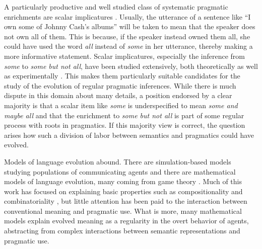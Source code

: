 \documentclass[a4paper, 11pt]{article}
\theoremstyle{Satz}
\begin{document}
A particularly productive and well studied class of systematic pragmatic enrichments are scalar
implicatures
\citep{horn:1984,Hirschberg1985:A-Theory-of-Sca,LevinsonPragmatics1983,Geurts2010:Quantity-Implic}. Usually,
the utterance of a sentence like ``I own some of Johnny Cash's albums'' will be taken to mean
that the speaker does not own all of them. This is because, if the speaker instead owned them
all, she could have used the word \emph{all} instead of \emph{some} in her utterance, thereby
making a more informative statement. Scalar implicatures, especially the inference from
\emph{some} to \emph{some but not all}, have been studied extensively, both theoretically
\citep[e.g.,][]{Sauerland2004:Scalar-Implicat,ChierchiaFox2008:The-Grammatical,Rooyvan-RooijJagerde-Jager2012:Explaining-Quan}
as well as experimentally
\citep[e.g.,][]{BottNoveck2004:Some-Utterances,huang+snedeker:2009,GrodnerKlein2010:Some-and-Possib,GoodmanStuhlmuller2013:Knowledge-and-I,DegenTanenhaus2012:Processing-Scal}. This
makes them particularly suitable candidates for the study of the evolution of regular pragmatic
inferences.  While there is much dispute in this domain about many details, a position endorsed
by a clear majority is that a scalar item like \emph{some} is underspecified to mean \emph{some
  and maybe all} and that the enrichment to \emph{some but not all} is part of some regular
process with roots in pragmatics. If this majority view is correct, the question arises how
such a division of labor between semantics and pragmatics could have evolved.

Models of language evolution abound. There are simulation-based models studying populations of
communicating agents
\citep{Hurford1989:Biological-Evol,Steels1995:A-Self-Organizi,LenaertsJansen2005:The-Evolutionar,SteelsBelpaeme2005:Coordinating-Pe,BaronchelliPuglisi2008:Cultural-route-,steels:2011,SpikeStadler2016:Minimal-Require}
and there are mathematical models of language evolution, many coming from game theory
\citep{Warneryd1993:Cheap-Talk-Coor,BlumeKim1993:Evolutionary-St,nowak+krakauer:1999,nowak:2006,Huttegger2007:Evolution-and-t,Skyrms2010:Signals}. Much
of this work has focused on explaining basic properties such as compositionality and
combinatoriality
\citep[e.g.,][]{Batali1998:Computational-S,nowak+krakauer:1999,nowak+etal:2000,KirbyHurford2002:The-Emergence-o,kirby:2002,SmithKirby2003:Iterated-Learni,Gong2007:Language-Evolut,kirby+etal:2015,verhoef+etal:2014,Franke2015:Proto-Syntax},
but little attention has been paid to the interaction between conventional meaning and
pragmatic use. What is more, many mathematical models explain evolved meaning as a regularity
in the overt behavior of agents, abstracting from complex interactions between semantic
representations and pragmatic use. 
\end{document}
